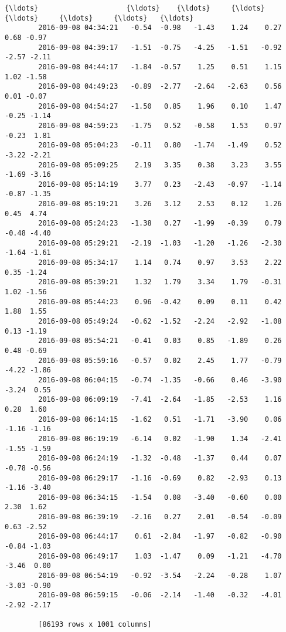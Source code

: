 \documentclass[a4paper,dvipdfmx]{jsarticle}
\begin{document}
\begin{Verbatim}[commandchars=\\\{\}]
        {\ldots}                     {\ldots}    {\ldots}     {\ldots}     {\ldots}     {\ldots}     {\ldots}   {\ldots}  
        2016-09-08 04:34:21   -0.54  -0.98   -1.43    1.24    0.27    0.68 -0.97  
        2016-09-08 04:39:17   -1.51  -0.75   -4.25   -1.51   -0.92   -2.57 -2.11  
        2016-09-08 04:44:17   -1.84  -0.57    1.25    0.51    1.15    1.02 -1.58  
        2016-09-08 04:49:23   -0.89  -2.77   -2.64   -2.63    0.56    0.01 -0.07  
        2016-09-08 04:54:27   -1.50   0.85    1.96    0.10    1.47   -0.25 -1.14  
        2016-09-08 04:59:23   -1.75   0.52   -0.58    1.53    0.97   -0.23  1.81  
        2016-09-08 05:04:23   -0.11   0.80   -1.74   -1.49    0.52   -3.22 -2.21  
        2016-09-08 05:09:25    2.19   3.35    0.38    3.23    3.55   -1.69 -3.16  
        2016-09-08 05:14:19    3.77   0.23   -2.43   -0.97   -1.14   -0.87 -1.35  
        2016-09-08 05:19:21    3.26   3.12    2.53    0.12    1.26    0.45  4.74  
        2016-09-08 05:24:23   -1.38   0.27   -1.99   -0.39    0.79   -0.48 -4.40  
        2016-09-08 05:29:21   -2.19  -1.03   -1.20   -1.26   -2.30   -1.64 -1.61  
        2016-09-08 05:34:17    1.14   0.74    0.97    3.53    2.22    0.35 -1.24  
        2016-09-08 05:39:21    1.32   1.79    3.34    1.79   -0.31    1.02 -1.56  
        2016-09-08 05:44:23    0.96  -0.42    0.09    0.11    0.42    1.88  1.55  
        2016-09-08 05:49:24   -0.62  -1.52   -2.24   -2.92   -1.08    0.13 -1.19  
        2016-09-08 05:54:21   -0.41   0.03    0.85   -1.89    0.26    0.48 -0.69  
        2016-09-08 05:59:16   -0.57   0.02    2.45    1.77   -0.79   -4.22 -1.86  
        2016-09-08 06:04:15   -0.74  -1.35   -0.66    0.46   -3.90   -3.24  0.55  
        2016-09-08 06:09:19   -7.41  -2.64   -1.85   -2.53    1.16    0.28  1.60  
        2016-09-08 06:14:15   -1.62   0.51   -1.71   -3.90    0.06   -1.16 -1.16  
        2016-09-08 06:19:19   -6.14   0.02   -1.90    1.34   -2.41   -1.55 -1.59  
        2016-09-08 06:24:19   -1.32  -0.48   -1.37    0.44    0.07   -0.78 -0.56  
        2016-09-08 06:29:17   -1.16  -0.69    0.82   -2.93    0.13   -1.16 -3.40  
        2016-09-08 06:34:15   -1.54   0.08   -3.40   -0.60    0.00    2.30  1.62  
        2016-09-08 06:39:19   -2.16   0.27    2.01   -0.54   -0.09    0.63 -2.52  
        2016-09-08 06:44:17    0.61  -2.84   -1.97   -0.82   -0.90   -0.84 -1.03  
        2016-09-08 06:49:17    1.03  -1.47    0.09   -1.21   -4.70   -3.46  0.00  
        2016-09-08 06:54:19   -0.92  -3.54   -2.24   -0.28    1.07   -3.03 -0.90  
        2016-09-08 06:59:15   -0.06  -2.14   -1.40   -0.32   -4.01   -2.92 -2.17  
        
        [86193 rows x 1001 columns]
\end{Verbatim}
        
\end{document}
